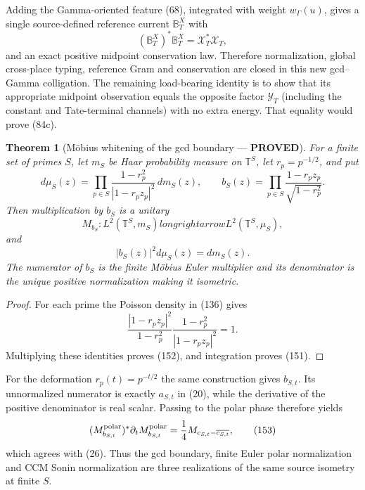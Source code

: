 \documentclass[11pt]{article}
\newtheorem{theorem}{Theorem}
\newcommand{\PROVED}{\textcolor{green!45!black}{\textbf{PROVED}}}
\begin{document}
Adding the Gamma-oriented feature (68), integrated with weight
$w_\Gamma(u)$, gives a single source-defined reference current
$\mathbb B_T^X$ with
\begin{equation}
 (\mathbb B_T^X)^*\mathbb B_T^X=\mathcal X_T^*\mathcal X_T, \tag{149}
\end{equation}
and an exact positive midpoint conservation law.  Therefore normalization,
global cross-place typing, reference Gram and conservation are closed in this
new gcd--Gamma colligation.  The remaining load-bearing identity is to show
that its appropriate midpoint observation equals the opposite factor
$\mathcal Y_T$ (including the constant and Tate-terminal channels) with no
extra energy.  That equality would prove (84c).

\begin{theorem}[M\"obius whitening of the gcd boundary --- \PROVED]
For a finite set of primes $S$, let $m_S$ be Haar probability measure on
$\mathbb T^S$, let $r_p=p^{-1/2}$, and put
\begin{equation}
 d\mu_S(z)=\prod_{p\in S}
 \frac{1-r_p^2}{|1-r_pz_p|^2}\,dm_S(z),
 \qquad
 b_S(z)=\prod_{p\in S}
 \frac{1-r_pz_p}{\sqrt{1-r_p^2}}.                     \tag{150}
\end{equation}
Then multiplication by $b_S$ is a unitary
\begin{equation}
 M_{b_S}:L^2(\mathbb T^S,m_S)longrightarrow
          L^2(\mathbb T^S,\mu_S),                     \tag{151}
\end{equation}
and
\begin{equation}
 |b_S(z)|^2d\mu_S(z)=dm_S(z).                         \tag{152}
\end{equation}
The numerator of $b_S$ is the finite M\"obius Euler multiplier and its
denominator is the unique positive normalization making it isometric.
\end{theorem}

\begin{proof}
For each prime the Poisson density in (136) gives
\[
 \frac{|1-r_pz_p|^2}{1-r_p^2}
 \frac{1-r_p^2}{|1-r_pz_p|^2}=1.
\]
Multiplying these identities proves (152), and integration proves (151).
\end{proof}

For the deformation $r_p(t)=p^{-t/2}$ the same construction gives
$b_{S,t}$.  Its unnormalized numerator is exactly $a_{S,t}$ in (20), while
the derivative of the positive denominator is real scalar.  Passing to the
polar phase therefore yields
\begin{equation}
 (M_{b_{S,t}}^{\rm polar})^*
 \partial_tM_{b_{S,t}}^{\rm polar}
 =\frac14M_{c_{S,t}-\overline{c_{S,t}}},               \tag{153}
\end{equation}
which agrees with (26).  Thus the gcd boundary, finite Euler polar
normalization and CCM Sonin normalization are three realizations of the same
source isometry at finite $S$.
\end{document}
